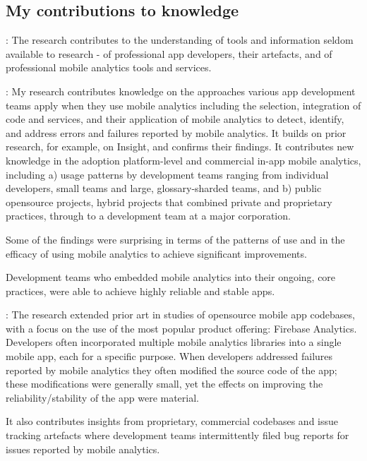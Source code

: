 \subsection{My contributions to knowledge}:
The research contributes to the understanding of tools and information seldom available to research - of professional app developers, their artefacts, and of professional mobile analytics tools and services. 

: 
My research contributes knowledge on the approaches various app development teams apply when they use mobile analytics including the selection, integration of code and services, and their application of mobile analytics to detect, identify, and address errors and failures reported by mobile analytics. It builds on prior research, for example, on Insight, and confirms their findings. It contributes new knowledge in the adoption platform-level and commercial in-app mobile analytics, including a) usage patterns by development teams ranging from individual  developers, small teams and large,  \gls{glossary-sharded} teams, and b) public opensource projects, hybrid projects that combined private and proprietary practices, through to a development team at a major corporation.

Some of the findings were surprising in terms of the patterns of use and in the efficacy of using mobile analytics to achieve significant improvements.

Development teams who embedded mobile analytics into their ongoing, core practices, were able to achieve highly reliable and stable apps. 

: 
The research extended prior art in studies of opensource mobile app codebases, with a focus on the use of the most popular product offering: Firebase Analytics. Developers often incorporated multiple mobile analytics libraries into a single mobile app, each for a specific purpose. When developers addressed failures reported by mobile analytics they often modified the source code of the app; these modifications were generally small, yet the effects on improving the reliability/stability of the app were material. 

It also contributes insights from proprietary, commercial codebases and issue tracking artefacts where development teams intermittently filed bug reports for issues reported by mobile analytics.

